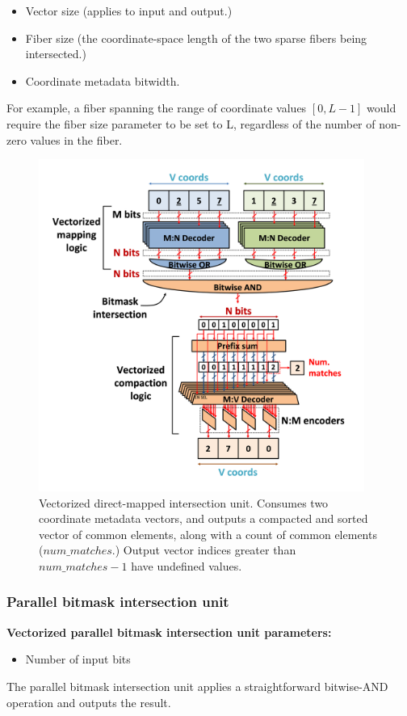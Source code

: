 \begin{itemize}
    \item Vector size (applies to input and output.)
    \item Fiber size (the coordinate-space length of the two sparse fibers being intersected.)
    \item Coordinate metadata bitwidth.
\end{itemize}

For example, a fiber spanning the range of coordinate values $[0,L-1]$ would require the fiber size parameter to be set to L, regardless of the number of non-zero values in the fiber.

\begin{figure}[ht]
    \centering
    \includegraphics[width=0.95\textwidth]{figures/direct_mapped_isect.png}
    \caption{Vectorized direct-mapped intersection unit. Consumes two coordinate metadata vectors, and outputs a compacted and sorted vector of common elements, along with a count of common elements ($num\_matches$.) Output vector indices greater than $num\_matches - 1$ have undefined values.}
    \label{fig:direct_mapped_isect}
\end{figure}

\subsubsection{Parallel bitmask intersection unit}

\textbf{Vectorized parallel bitmask intersection unit parameters:}

\begin{itemize}
    \item Number of input bits
\end{itemize}

The parallel bitmask intersection unit applies a straightforward bitwise-AND operation and outputs the result.